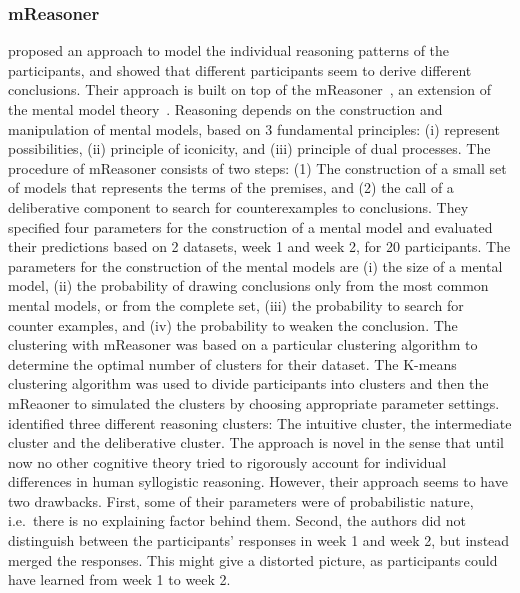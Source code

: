 \documentclass[12pt]{article}
\begin{document}
\subsubsection{mReasoner}

\cite{khemlani:2016} proposed an approach to model the individual reasoning patterns of the participants, and 
showed that different participants seem to derive different conclusions.
Their approach is built on top of the mReasoner~\cite{khemlani:2013}, an extension of the mental model theory~\cite{johnsonlaird:1983}.
Reasoning depends on the construction and manipulation of mental models, based on 3 fundamental principles: 
(i) represent possibilities, (ii) principle of iconicity, and (iii) principle of dual processes.
 The procedure of mReasoner consists of two steps:
(1) The construction of a small set of models that represents the terms of the premises, and
(2) the call of a deliberative component to search for counterexamples to conclusions.
They specified four parameters for the construction of a mental model and evaluated their
predictions based on 2 datasets, week 1 and week 2, for 20 participants.
The parameters for the construction of the mental models are (i) the 
size of a mental model, (ii) the probability of drawing conclusions only from the most common mental models, or from the complete set,
(iii) the probability to search for counter examples,
and (iv) the probability to weaken the conclusion.
The clustering with mReasoner was based on a particular clustering algorithm to determine the optimal number of clusters for their dataset.
The K-means clustering algorithm was used to divide participants into clusters and then
the mReaoner to simulated the clusters by choosing appropriate parameter settings.
\cite{khemlani:2016} identified three different reasoning clusters: The intuitive cluster, the intermediate cluster and the deliberative cluster.
The approach is novel in the sense that until now no other cognitive theory tried to rigorously account for individual differences in human syllogistic reasoning. However, their approach seems to have two drawbacks. First, some of their 
parameters were of probabilistic nature, i.e.\ there is no explaining factor behind them. Second, the authors did not distinguish between the participants' 
responses in week 1 and week 2, but instead merged the responses. This might give a distorted picture, as participants could
have learned from week 1 to week 2.
\end{document}
